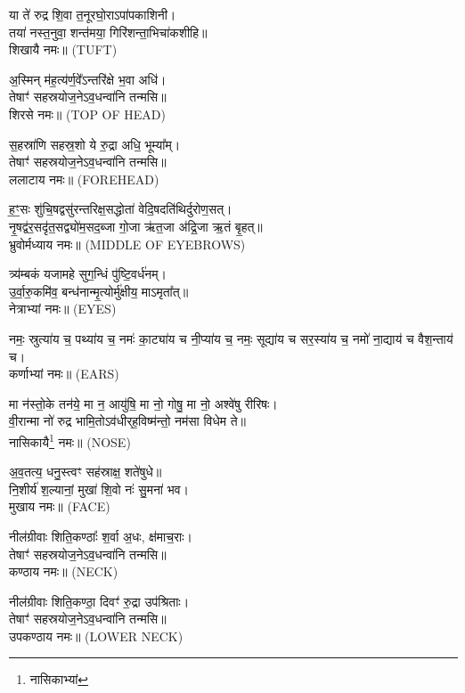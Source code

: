 

या ते॑ रुद्र शि॒वा त॒नूरघो॒राऽपा॑पकाशिनी।\\
तया॑ नस्त॒नुवा॒ शन्त॑मया॒ गिरि॑शन्ता॒भिचा॑कशीहि॥\\ शिखायै नमः॥ {\scriptsize (TUFT)}

अ॒स्मिन् म॑ह॒त्य॑र्ण॒वे᳚ऽन्तरि॑क्षे भ॒वा अधि॑।\\
तेषाꣳ॑ सहस्रयोज॒नेऽव॒धन्वा॑नि तन्मसि॥\\
शिरसे नमः॥ {\scriptsize (TOP OF HEAD)}

स॒हस्रा॑णि सहस्र॒शो ये रु॒द्रा अधि॒ भूम्या᳚म्।\\
तेषाꣳ॑ सहस्रयोज॒नेऽव॒धन्वा॑नि तन्मसि॥\\
ललाटाय नमः॥ {\scriptsize (FOREHEAD)}

ह॒ꣳ॒सः शु॑चि॒षद्वसु॑रन्तरिक्ष॒सद्धोता॑ वेदि॒षदति॑थिर्दुरोण॒सत्।\\
नृ॒षद्व॑र॒सदृ॑त॒सद्व्यो॑म॒सद॒ब्जा गो॒जा ऋ॑त॒जा अ॑द्रि॒जा ऋ॒तं बृ॒हत्॥\\
भ्रुवोर्मध्याय नमः॥ {\scriptsize (MIDDLE OF EYEBROWS)}

त्र्य॑म्बकं यजामहे सुग॒न्धिं पु॑ष्टि॒वर्ध॑नम्।\\
उ॒र्वा॒रु॒कमि॑व॒ बन्ध॑नान्मृ॒त्योर्मु॑क्षीय॒ माऽमृता᳚त्॥\\
नेत्राभ्यां नमः॥ {\scriptsize (EYES)}

नमः॒ स्रुत्या॑य च॒ पथ्या॑य च॒ नमः॑ का॒ट्या॑य च नी॒प्या॑य च॒ %
नमः॒ सूद्या॑य च सर॒स्या॑य च॒ नमो॑ ना॒द्याय॑ च वैश॒न्ताय॑ च।\\
कर्णाभ्यां नमः॥ {\scriptsize (EARS)}

मा न॑स्तो॒के तन॑ये॒ मा न॒ आयु॑षि॒ मा नो॒ गोषु॒ मा नो॒ अश्वे॑षु रीरिषः।\\
वी॒रान्मा नो॑ रुद्र भामि॒तोऽव॑धीर्‌ह॒विष्म॑न्तो॒ नम॑सा विधेम ते॥\\
नासिकायै\footnote{नासिकाभ्यां} नमः॥ {\scriptsize (NOSE)}

अ॒व॒तत्य॒ धनु॒स्त्वꣳ सह॑स्राक्ष॒ शते॑षुधे॥\\
नि॒शीर्य॑ श॒ल्यानां॒ मुखा॑ शि॒वो नः॑ सु॒मना॑ भव।\\
मुखाय नमः॥ {\scriptsize (FACE)}

नील॑ग्रीवाः शिति॒कण्ठाः᳚ श॒र्वा अ॒धः, क्ष॑माच॒राः।\\
तेषाꣳ॑ सहस्रयोज॒नेऽव॒धन्वा॑नि तन्मसि॥\\
कण्ठाय नमः॥ {\scriptsize (NECK)}

नील॑ग्रीवाः शिति॒कण्ठा॒ दिवꣳ॑ रु॒द्रा उप॑श्रिताः।\\
तेषाꣳ॑ सहस्रयोज॒नेऽव॒धन्वा॑नि तन्मसि॥\\
उपकण्ठाय नमः॥ {\scriptsize (LOWER NECK)}

